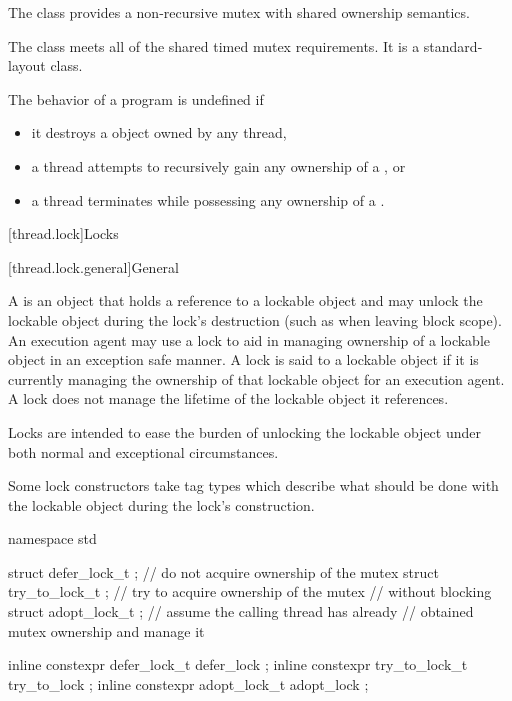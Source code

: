 \pnum
The class  provides a non-recursive mutex with shared
ownership semantics.

\pnum
The class  meets
all of the shared timed mutex requirements.
It is a standard-layout class.

\pnum
The behavior of a program is undefined if
\begin{itemize}
\item it destroys a  object owned by any thread,
\item a thread attempts to recursively gain any ownership of a , or
\item a thread terminates while possessing any ownership of a .
\end{itemize}

[thread.lock]{Locks}

[thread.lock.general]{General}

\pnum
A  is an object that holds a reference to a lockable object and may unlock the
lockable object during the lock's destruction (such as when leaving block scope). An execution
agent may use a lock to aid in managing ownership of a lockable object in an exception safe
manner. A lock is said to  a lockable object if it is currently managing the
ownership of that lockable object for an execution agent. A lock does not manage the lifetime
of the lockable object it references.
\begin{note}
Locks are intended to ease the burden of
unlocking the lockable object under both normal and exceptional circumstances.
\end{note}

\pnum
Some lock constructors take tag types which describe what should be done with the lockable
object during the lock's construction.

%
%
%
%
%
%
\begin{codeblock}
namespace std {
  struct defer_lock_t  { };     // do not acquire ownership of the mutex
  struct try_to_lock_t { };     // try to acquire ownership of the mutex
                                // without blocking
  struct adopt_lock_t  { };     // assume the calling thread has already
                                // obtained mutex ownership and manage it

  inline constexpr defer_lock_t  defer_lock { };
  inline constexpr try_to_lock_t try_to_lock { };
  inline constexpr adopt_lock_t  adopt_lock { };
}
\end{codeblock}


